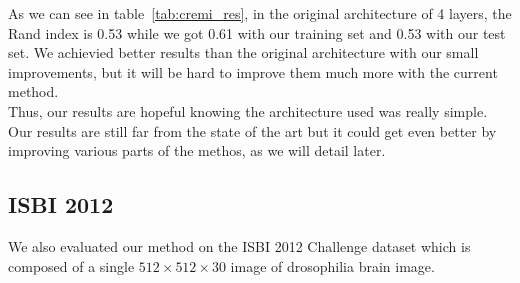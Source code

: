 As we can see in table~\ref{tab:cremi_res}, in the original architecture of 4 layers, 
the Rand index is 0.53 while we got 0.61 with our training set and 0.53 with our test set.
We achievied better results than the original architecture with our small
improvements, but it will be hard to improve them much more with the current
method.\\

Thus, our results are hopeful knowing the architecture used was really simple.\\ 
Our results are still far from the state of the art but it could get even
better by improving various parts of the methos, as we will detail later.\\

\subsection{ISBI 2012}

We also evaluated our method on the ISBI 2012 Challenge dataset
which is composed of a single $512\times512\times30$ image of drosophilia brain
image.\\


